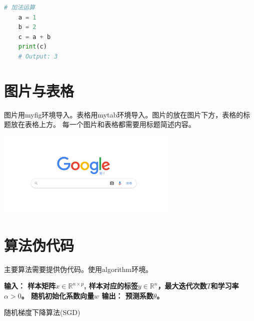 \documentclass[a4paper,9pt]{extarticle}
\begin{document}
\begin{multicols*}{2}
\begin{lstlisting}[language=Python]
    # 加法运算
    a = 1
    b = 2
    c = a + b
    print(c)
    # Output: 3
    \end{lstlisting}
    
\section{图片与表格}
    图片用myfig环境导入。表格用mytab环境导入。图片的放在图片下方，表格的标题放在表格上方。
    每一个图片和表格都需要用标题简述内容。
	
\begin{myfig}[!htb]
  \centering
  \includegraphics[width=\linewidth]{images.png}
\end{myfig}
 
\begin{mytab}[!htb]
\end{mytab}

\section{算法伪代码}
主要算法需要提供伪代码。使用algorithm环境。

\begin{algorithm}[H]
    \SetAlgoLined
    \bfseries{输入：} 样本矩阵$x \in \mathbb{R}^{n \times p}$, 样本对应的标签$y \in \mathbb{R}^n$，最大迭代次数$T$和学习率$\alpha > 0$。
     随机初始化系数向量$w$\;
     \bfseries{输出：} 预测系数$\theta$。
     \caption{随机梯度下降算法(SGD)}
     \label{algo:SGD}
    \end{algorithm}
 

\end{multicols*}
\end{document}
